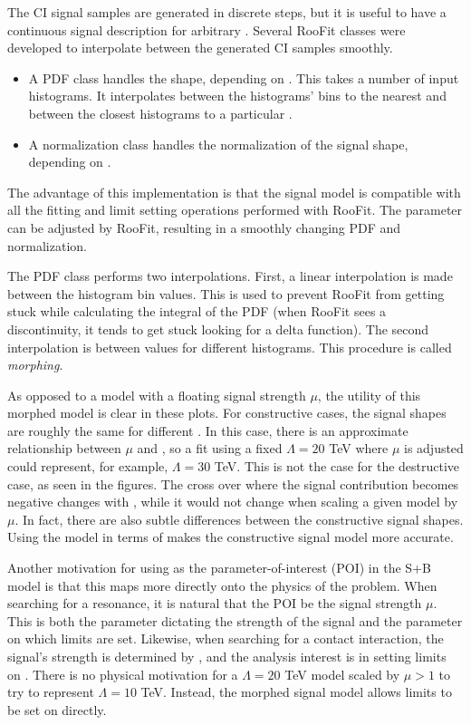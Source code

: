 The CI signal samples are generated in discrete steps, but it is useful to have a continuous signal description for arbitrary \lam.
Several RooFit classes were developed to interpolate between the generated CI samples smoothly.
\begin{itemize}
    \item A PDF class handles the shape, depending on \lam. This takes a number of input histograms. It interpolates between the histograms' bins to the nearest \mll and between the closest histograms to a particular \lam.
    \item A normalization class handles the normalization of the signal shape, depending on \lam.
\end{itemize}
The advantage of this implementation is that the signal model is compatible with all the fitting and limit setting operations performed with RooFit.
The \lam parameter can be adjusted by RooFit, resulting in a smoothly changing PDF and normalization.

The PDF class performs two interpolations.
First, a linear interpolation is made between the histogram bin values.
This is used to prevent RooFit from getting stuck while calculating the integral of the PDF (when RooFit sees a discontinuity, it tends to get stuck looking for a delta function).
The second interpolation is between \lam values for different histograms.
This procedure is called \emph{morphing}.

As opposed to a model with a floating signal strength $\mu$, the utility of this morphed model is clear in these plots.
For constructive cases, the signal shapes are roughly the same for different \lam.
In this case, there is an approximate relationship between $\mu$ and \lam, so a fit using a fixed $\Lambda=20$ TeV where $\mu$ is adjusted could represent, for example, $\Lambda=30$ TeV.
This is not the case for the destructive case, as seen in the figures.
The cross over where the signal contribution becomes negative changes with \lam, while it would not change when scaling a given model by $\mu$.
In fact, there are also subtle differences between the constructive signal shapes.
Using the model in terms of \lam makes the constructive signal model more accurate.

Another motivation for using \lam as the parameter-of-interest (POI) in the S+B model is that this maps more directly onto the physics of the problem.
When searching for a resonance, it is natural that the POI be the signal strength $\mu$.
This is both the parameter dictating the strength of the signal and the  parameter on which limits are set.
Likewise, when searching for a contact interaction, the signal's strength is determined by \lam, and the analysis interest is in setting limits on \lam.
There is no physical motivation for a $\Lambda=20$ TeV model scaled by $\mu>1$ to try to represent $\Lambda=10$ TeV. Instead, the morphed signal model allows limits to be set on \lam directly.


